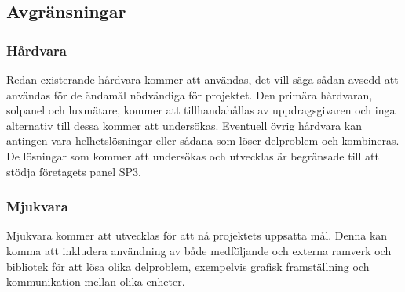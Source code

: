    \subsection{Avgränsningar} %
    \label{sub:avgr_nsningar}
        \subsubsection{Hårdvara} %
        \label{ssub:h_rdvara}
            Redan existerande hårdvara kommer att användas, det vill säga sådan avsedd att användas för de ändamål nödvändiga för projektet. 
            Den primära hårdvaran, solpanel och luxmätare, kommer att tillhandahållas av uppdragsgivaren och inga alternativ till dessa kommer att undersökas. 
            Eventuell övrig hårdvara kan antingen vara helhetslösningar eller sådana som löser delproblem och kombineras. 
            De lösningar som kommer att undersökas och utvecklas är begränsade till att stödja företagets panel SP3.\bigskip

        \subsubsection{Mjukvara} %
        \label{ssub:mjukvara}
            Mjukvara kommer att utvecklas för att nå projektets uppsatta mål. 
            Denna kan komma att inkludera användning av både medföljande och externa ramverk och bibliotek för att lösa olika delproblem, exempelvis grafisk framställning och kommunikation mellan olika enheter.


